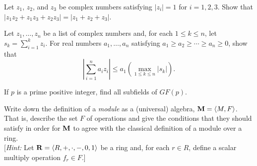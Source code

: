 \begin{problem}[Golan 16]
Let $z_1$, $z_2$, and $z_3$ be complex numbers satisfying 
$|z_i| = 1$ for $i = 1, 2, 3$. Show that 
$|z_1 z_2 + z_1 z_3 + z_2 z_3 | = |z_1 + z_2 + z_3|$.
\end{problem}
\smallskip
\begin{solution}


\end{solution}
\probskip




\begin{problem} 
Let $z_1, \dots, z_n$ be a list of complex
numbers and, for each $1 \leq k \leq n$, 
let $s_k = \sum_{i=1}^k z_i$. For real numbers
$a_1, \dots, a_n$ satisfying 
$a_1 \geq a_2 \geq \cdots \geq a_n \geq 0$, 
show that
\begin{equation}
\label{eq:Abels}  
\left| \sum_{i=1}^n a_i z_i \right| 
\leq a_1 \left( \max_{1 \leq k \leq n} |s_k|\right).
\end{equation}
\end{problem}
\smallskip
\begin{solution}


\end{solution}
\probskip



\begin{problem}[Golan 24]
If $p$ is a prime positive integer, find all subfields of $GF(p)$.
\end{problem}


\begin{solution}


\end{solution}
\probskip
\begin{problem}
Write down the definition of a \emph{module} as a (universal) algebra, 
$\mathbf{M} = \langle M, F\rangle$.  That is, describe the set $F$ of operations and 
give the conditions that they should satisfy in order for $\mathbf{M}$ to 
agree with the classical definition of a module over a ring.\\[4pt]
[{\it Hint:} Let $\mathbf{R} = \langle R, +, \cdot, -, 0, 1\rangle$ be a ring and,
  for each $r\in R$, define a scalar multiply operation $f_r \in F$.]
\end{problem}

